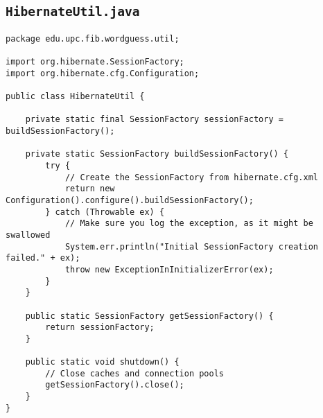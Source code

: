 \subsection{\texttt{HibernateUtil.java}}
\begin{verbatim}
package edu.upc.fib.wordguess.util;

import org.hibernate.SessionFactory;
import org.hibernate.cfg.Configuration;

public class HibernateUtil {

    private static final SessionFactory sessionFactory = buildSessionFactory();

    private static SessionFactory buildSessionFactory() {
        try {
            // Create the SessionFactory from hibernate.cfg.xml
            return new Configuration().configure().buildSessionFactory();
        } catch (Throwable ex) {
            // Make sure you log the exception, as it might be swallowed
            System.err.println("Initial SessionFactory creation failed." + ex);
            throw new ExceptionInInitializerError(ex);
        }
    }

    public static SessionFactory getSessionFactory() {
        return sessionFactory;
    }

    public static void shutdown() {
        // Close caches and connection pools
        getSessionFactory().close();
    }
}
\end{verbatim}